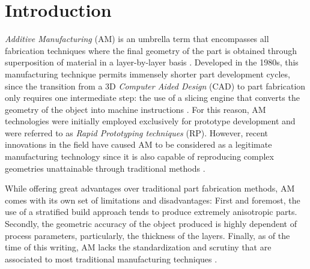 \documentclass[main.tex]{subfiles}
\begin{document}
\chapter*{Introduction}\label{ch:intr}
 
\emph{Additive Manufacturing} (AM) is an umbrella term that encompasses all fabrication techniques where the final geometry of the part is obtained through superposition of material in a layer-by-layer basis \cite{Gibson2015}. Developed in the 1980s, this manufacturing technique permits immensely shorter part development cycles, since the transition from a 3D \emph{Computer Aided Design} (CAD) to part fabrication only requires one intermediate step: the use of a slicing engine that converts the geometry of the object into machine instructions \cite{Gibson2015}. For this reason, AM technologies were initially employed exclusively for prototype development and were referred to as \emph{Rapid Prototyping techniques} (RP). However, recent innovations in the field have caused AM to be considered as a legitimate manufacturing technology since it is also capable of reproducing complex geometries unattainable through traditional methods \cite{Gibson2015}.

While offering great advantages over traditional part fabrication methods, AM comes with its own set of limitations and disadvantages: First and foremost, the use of a stratified build approach tends to produce extremely anisotropic parts. Secondly, the geometric accuracy of the object produced is highly dependent of process parameters, particularly, the thickness of the layers. Finally, as of the time of this writing, AM lacks the standardization and scrutiny that are associated to most traditional manufacturing techniques \cite{Gibson2015}.  
\end{document}
